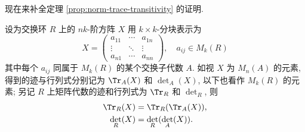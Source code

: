 现在来补全定理 \ref{prop:norm-trace-transitivity} 的证明.
\begin{lemma}\label{prop:det-blocks}
	设为交换环 $R$ 上的 $nk$-阶方阵 $X$ 用 $k \times k$-分块表示为
	\[ X = \begin{pmatrix}
		a_{11} & \cdots & a_{1n} \\
		\vdots & \ddots & \vdots \\
		a_{n1} & \cdots & a_{nn}
	\end{pmatrix}, \quad a_{ij} \in M_k(R) \]
	其中每个 $a_{ij}$ 同属于 $M_k(R)$ 的某个交换子代数 $A$. 如视 $X$ 为 $M_n(A)$ 的元素, 得到的迹与行列式分别记为 $\Tr_A(X)$ 和 $\det_A(X)$, 以下也看作 $M_k(R)$ 的元素; 另记 $R$ 上矩阵代数的迹和行列式为 $\Tr_R$ 和 $\det_R$, 则
	\begin{align*}
		\Tr_R(X) & = \Tr_R( \Tr_A(X)), \\
		\det_R(X) & = \det_R(\det_A(X)).
	\end{align*}
\end{lemma}
